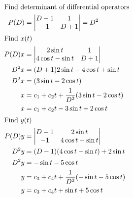 \documentclass[12pt,final]{novelette} %
\begin{document}
\begin{question}[resume]
    \vspace*{-1em}
    \begin{align*}
        \intertext{Find determinant of differential operators}
        P(D)   & =
        \begin{vmatrix}
            D - 1 & 1     \\
            -1    & D + 1
        \end{vmatrix} = D^2                                         \\
        \intertext{Find $x(t)$}
        P(D) x & =
        \begin{vmatrix}
            2 \sin t          & 1   \\
            4 \cos t - \sin t & D+1
        \end{vmatrix}                                     \\
        D^2 x  & = (D+1) 2 \sin t - 4 \cos t + \sin t               \\
        D^2 x  & = (3 \sin t - 2 \cos t)                            \\
        x      & = c_1 + c_2 t + \frac{1}{D^2}(3 \sin t - 2 \cos t) \\
        x      & = c_1 + c_2 t - 3 \sin t + 2 \cos t                \\
        \intertext{Find $y(t)$}
        P(D) y & =
        \begin{vmatrix}
            D - 1 & 2 \sin t          \\
            -1    & 4 \cos t - \sin t
        \end{vmatrix}                                   \\
        D^2 y  & = (D-1)(4 \cos t - \sin t) + 2 \sin t              \\
        D^2 y  & = - \sin t - 5 \cos t                              \\
        y      & = c_3 + c_4 t + \frac{1}{D^2}(- \sin t - 5 \cos t) \\
        y      & = c_3 + c_4 t + \sin t + 5 \cos t
    \end{align*}


\end{question}
\end{document}

